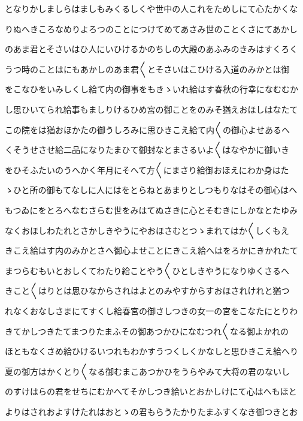 \documentclass[a4paper,11pt,landscape]{ltjtarticle}
\begin{document}
\par\medskip
となりかしましらはましもみくるしくや世中の人これをためしにて心たかくな
\par\medskip
りぬへきころなめりよろつのことにつけてめてあさみ世のことくさにてあかし
\par\medskip
のあま君とそさいはひ人にいひけるかのちしの大殿のあふみのきみはすくろく
\par\medskip
うつ時のことはにもあかしのあま君〱とそさいはこひける入道のみかとは御
\par\medskip
をこなひをいみしくし給て内の御事をもきゝいれ給はす春秋の行幸になむむか
\par\medskip
し思ひいてられ給事もましりけるひめ宮の御ことをのみそ猶えおほしはなたて
\par\medskip
この院をは猶おほかたの御うしろみに思ひきこえ給て内〱の御心よせあるへ
\par\medskip
くそうせさせ給二品になりたまひて御封なとまさるいよ〱はなやかに御いき
\par\medskip
をひそふたいのうへかく年月にそへて方〱にまさり給御おほえにわか身はた
\par\medskip
ゝひと所の御もてなしに人にはをとらねとあまりとしつもりなはその御心はへ
\par\medskip
もつゐにをとろへなむさらむ世をみはてぬさきに心とそむきにしかなとたゆみ
\par\medskip
なくおほしわたれとさかしきやうにやおほさむとつゝまれてはか〱しくもえ
\par\medskip
きこえ給はす内のみかとさへ御心よせことにきこえ給へはをろかにきかれたて
\par\medskip
まつらむもいとおしくてわたり給ことやう〱ひとしきやうになりゆくさるへ
\par\medskip
きこと〱はりとは思ひなからされはよとのみやすからすおほされけれと猶つ
\par\medskip
れなくおなしさまにてすくし給春宮の御さしつきの女一の宮をこなたにとりわ
\par\medskip
きてかしつきたてまつりたまふその御あつかひになむつれ〱なる御よかれの
\par\medskip
ほともなくさめ給ひけるいつれもわかすうつくしくかなしと思ひきこえ給へり
\par\medskip
夏の御方はかくとり〱なる御むまこあつかひをうらやみて大将の君のないし
\par\medskip
のすけはらの君をせちにむかへてそかしつき給いとおかしけにて心はへもほと
\par\medskip
よりはされおよすけたれはおとゝの君もらうたかりたまふすくなき御つきとお
\par\medskip
\end{document}
